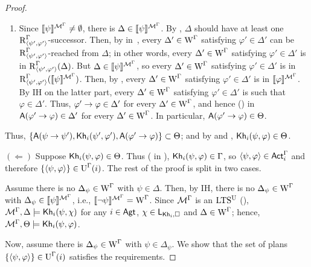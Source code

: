 \begin{proof}
\begin{enumerate}
    \item Since $\llbracket \psi \rrbracket^{\mathcal{M}^\Gamma} \neq \emptyset$, there is $\Delta \in \llbracket \psi \rrbracket^{\mathcal{M}^\Gamma}$.
    By , $\Delta$ should have at least one $\operatorname{R}^\Gamma_{\langle \psi',\varphi' \rangle}$-successor.
    Then, by  in~, every $\Delta' \in \operatorname{W}^\Gamma$ satisfying $\varphi' \in \Delta'$ can be $\operatorname{R}^\Gamma_{\langle \psi',\varphi' \rangle}$-reached from $\Delta$; in other words, every $\Delta' \in \operatorname{W}^\Gamma$ satisfying $\varphi' \in \Delta'$ is in $\operatorname{R}^\Gamma_{\langle \psi',\varphi' \rangle}(\Delta)$.
    But $\Delta \in \llbracket \psi \rrbracket^{\mathcal{M}^\Gamma}$, so every $\Delta' \in \operatorname{W}^\Gamma$ satisfying $\varphi' \in \Delta'$ is in $\operatorname{R}^\Gamma_{\langle \psi',\varphi' \rangle}(\llbracket \psi \rrbracket^{\mathcal{M}^\Gamma})$.
    Then, by , every $\Delta' \in \operatorname{W}^\Gamma$ satisfying $\varphi' \in \Delta'$ is in $\llbracket \varphi \rrbracket^{\mathcal{M}^\Gamma}$.
    By IH on the latter part, every $\Delta' \in \operatorname{W}^\Gamma$ satisfying $\varphi' \in \Delta'$ is such that $\varphi \in \Delta'$.
    Thus, $\varphi' \rightarrow \varphi \in \Delta'$ for every $\Delta' \in \operatorname{W}^\Gamma$, and hence () in~ ${\sf A}(\varphi' \rightarrow \varphi) \in \Delta'$ for every $\Delta' \in \operatorname{W}^\Gamma$.
    In particular, ${\sf A}(\varphi' \rightarrow \varphi) \in \Theta$.
\end{enumerate}
Thus, $\{ {\sf A}(\psi \rightarrow \psi'), {\sf Kh}_i(\psi',\varphi'), {\sf A}(\varphi' \rightarrow \varphi) \} \subset \Theta$;
and by  and , ${\sf Kh}_i(\psi, \varphi) \in \Theta$.
\smallskip

\noindent
$(\Leftarrow)$ Suppose ${\sf Kh}_i(\psi, \varphi) \in \Theta$.
Thus ( in ), ${\sf Kh}_i(\psi, \varphi) \in \Gamma$, so $\langle \psi, \varphi \rangle \in {\rm \sf Act}^\Gamma_i$ and therefore $\{ \langle \psi, \varphi \rangle \} \in \operatorname{U}^\Gamma(i)$.
The rest of the proof is split in two cases.
\smallskip

Assume there is no $\Delta_\psi \in \operatorname{W}^\Gamma$ with $\psi \in \Delta$.
Then, by IH, there is no $\Delta_\psi \in \operatorname{W}^\Gamma$ with $\Delta_\psi \in \llbracket \psi \rrbracket^{\mathcal{M}^\Gamma}$, i.e., $\llbracket \lnot\psi \rrbracket^{\mathcal{M}^\Gamma} = \operatorname{W}^\Gamma$.
Since $\mathcal{M}^\Gamma$ is an $\textup{LTS$^\text{\textup{U}}$}$ (),  $\mathcal{M}^\Gamma, \Delta \models {\sf Kh}_i(\psi, \chi)$ for any $i \in {\rm \sf Agt}$, $\chi \in \mathsf{L}_{{\sf Kh}_i,\square}$ and $\Delta \in \operatorname{W}^\Gamma$; hence, $\mathcal{M}^\Gamma, \Theta \models {\sf Kh}_i(\psi, \varphi)$.
\smallskip

Now, assume there is $\Delta_\psi \in \operatorname{W}^\Gamma$ with $\psi \in \Delta_\psi$. We show that the set of plans $\{ \langle \psi, \varphi \rangle \} \in \operatorname{U}^\Gamma(i)$ satisfies the requirements.


\end{proof}

